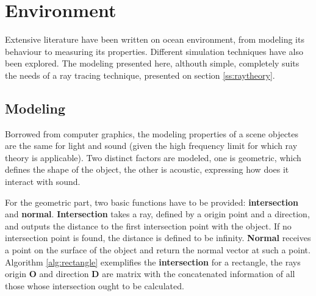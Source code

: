 \section{Environment}

Extensive literature have been written on ocean environment, from modeling its
behaviour to measuring its properties. Different simulation techniques have also
been explored\cite{Etter2013}. The modeling presented here, althouth simple,
completely suits the needs of a ray tracing technique, presented on section
\ref{ss:raytheory}.

\subsection{Modeling}

Borrowed from computer graphics, the modeling properties of a scene objectes
are the same for light and sound (given the high frequency limit for which ray
theory is applicable). Two distinct factors are modeled, one is geometric,
which defines the shape of the object, the other is acoustic, expressing how
does it interact with sound.

For the geometric part, two basic functions have to be provided: \textbf{intersection}
and \textbf{normal}. \textbf{Intersection} takes a ray, defined by a origin point and a
direction, and outputs the distance to the first intersection point with the
object. If no intersection point is found, the distance is defined to be
infinity. \textbf{Normal} receives a point on the surface of the object and
return the normal vector at such a point. Algorithm \ref{alg:rectangle}
exemplifies the \textbf{intersection} for a rectangle, the rays origin
$\mathbf{O}$ and direction $\mathbf{D}$ are matrix with the concatenated
information of all those whose intersection ought to be calculated.

